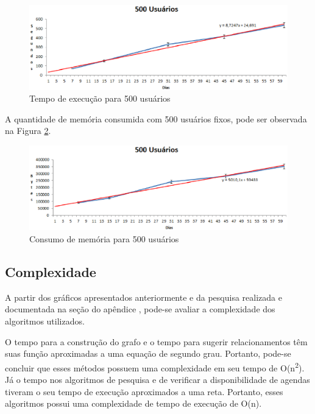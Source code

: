\begin{figure}[!h]
	\centering
	\includegraphics[scale=0.8]{figuras/resultados/graficos/500_user_tempo.eps}
	\caption[Tempo de execução para 500 usuários]{Tempo de execução para 500 usuários}
	\label{500users_tempo}
\end{figure}

A quantidade de memória consumida com 500 usuários fixos, pode ser observada na Figura \ref{500users_memoria}.

\begin{figure}[!h]
	\centering
	\includegraphics[scale=0.8]{figuras/resultados/graficos/500_user_memo.eps}
	\caption[Consumo de memória para 500 usuários]{Consumo de memória para 500 usuários}
	\label{500users_memoria}
\end{figure}

\subsection{Complexidade}

A partir dos gráficos apresentados anteriormente e da pesquisa realizada e documentada na seção do apêndice , pode-se avaliar a complexidade dos algoritmos utilizados.

O tempo para a construção do grafo e o tempo para sugerir relacionamentos têm suas função aproximadas a uma equação de segundo grau. Portanto, pode-se concluir que esses métodos possuem uma complexidade em seu tempo de O(n\textsuperscript{2}). Já o tempo nos algoritmos de pesquisa e de verificar a disponibilidade de agendas tiveram o seu tempo de execução aproximados a uma reta. Portanto, esses algoritmos possui uma complexidade de tempo de execução de O(n).

